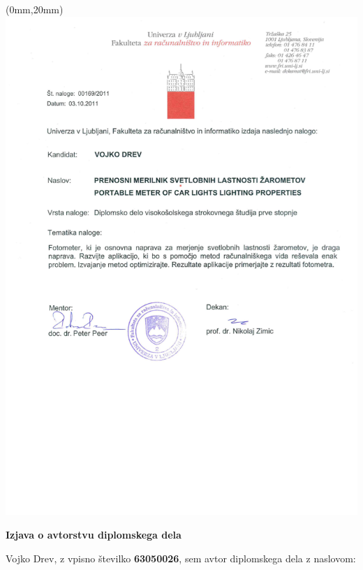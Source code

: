 \documentclass[oneside, a4paper, 12pt]{book}
\newcommand{\clearemptydoublepage}{\newpage{\pagestyle{empty}\cleardoublepage}}
\begin{document}
\begin{textblock*}{297mm}(0mm,20mm)
        \includegraphics[keepaspectratio=true, width=19cm]{slike/orig-tema.png}
\end{textblock*}

\begin{center}

\end{center}

\clearemptydoublepage

\vspace*{1cm}
\begin{center} 
{\Large \textbf{\sc Izjava o avtorstvu diplomskega dela}}
\end{center}

\vspace{1cm}
\noindent Vojko Drev,
z vpisno številko \textbf{63050026}, sem avtor  diplomskega dela z 
naslovom:
   
\end{document}
